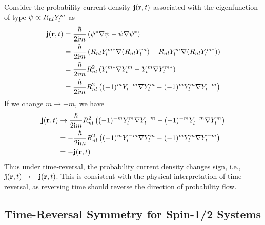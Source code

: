 Consider the probability current density $\mathbf{j}(\mathbf{r},t)$ associated with the eigenfunction of type $ \psi \propto R_{nl}Y_{l}^{m}$ as 
\begin{align*}
    \mathbf{j}(\mathbf{r},t) &= \frac{\hbar}{2 \mathrm{i} m} \left( \psi^* \nabla \psi - \psi \nabla \psi^* \right) \\
    &= \frac{\hbar}{2 \mathrm{i} m} \left( R_{nl} Y_{l}^{m*} \nabla (R_{nl} Y_{l}^{m}) - R_{nl} Y_{l}^{m} \nabla (R_{nl} Y_{l}^{m*}) \right) \\
    &= \frac{\hbar}{2 \mathrm{i} m} R_{nl}^2 \left( Y_{l}^{m*} \nabla Y_{l}^{m} - Y_{l}^{m} \nabla Y_{l}^{m*} \right) \\
    & = \frac{\hbar}{2 \mathrm{i} m} R^2_{nl} \left( (-1)^m Y_{l}^{-m} \nabla Y_{l}^{m} - (-1)^m Y_{l}^{m} \nabla Y_{l}^{-m} \right)
\end{align*}
If we change $m \to -m$, we have
\begin{align*}
    \mathbf{j}(\mathbf{r},t) &\to \frac{\hbar}{2 \mathrm{i} m} R^2_{nl} \left( (-1)^{-m} Y_{l}^{m} \nabla Y_{l}^{-m} - (-1)^{-m} Y_{l}^{-m} \nabla Y_{l}^{m} \right) \\
    &= - \frac{\hbar}{2 \mathrm{i} m} R^2_{nl} \left((-1)^m Y_{l}^{-m} \nabla Y_{l}^{m} - (-1)^m Y_{l}^{m} \nabla Y_{l}^{-m} \right) \\
    &= - \mathbf{j}(\mathbf{r},t)
\end{align*}
Thus under time-reversal, the probability current density changes sign, i.e., $\mathbf{j}(\mathbf{r},t) \to - \mathbf{j}(\mathbf{r},t)$. This is consistent with the physical interpretation of time-reversal, as reversing time should reverse the direction of probability flow.

\subsection{Time-Reversal Symmetry for Spin-1/2 Systems}

